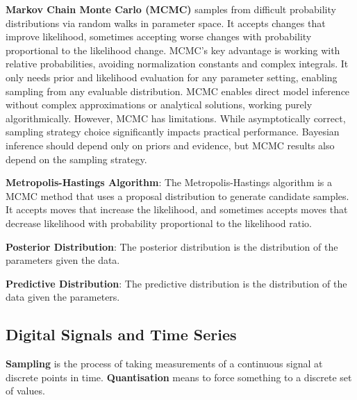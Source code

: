 \documentclass{article}
\begin{document}

\noindent \textbf{Markov Chain Monte Carlo (MCMC)} samples from difficult probability distributions via random walks in parameter space. It accepts changes that improve likelihood, sometimes accepting worse changes with probability proportional to the likelihood change.
MCMC's key advantage is working with relative probabilities, avoiding normalization constants and complex integrals. It only needs prior and likelihood evaluation for any parameter setting, enabling sampling from any evaluable distribution.
MCMC enables direct model inference without complex approximations or analytical solutions, working purely algorithmically.
However, MCMC has limitations. While asymptotically correct, sampling strategy choice significantly impacts practical performance. Bayesian inference should depend only on priors and evidence, but MCMC results also depend on the sampling strategy.



\noindent \textbf{Metropolis-Hastings Algorithm}:
The Metropolis-Hastings algorithm is a MCMC method that uses a proposal distribution to generate candidate samples.
It accepts moves that increase the likelihood, and sometimes accepts moves that decrease likelihood with probability
proportional to the likelihood ratio.


\noindent \textbf{Posterior Distribution}:
The posterior distribution is the distribution of the parameters given the data.

\noindent \textbf{Predictive Distribution}:
The predictive distribution is the distribution of the data given the parameters.



\subsection*{Digital Signals and Time Series}


\noindent \textbf{Sampling} is the process of taking measurements of a continuous signal at discrete points in time.
\noindent \textbf{Quantisation} means to force something to a discrete set of values.

\end{document}
